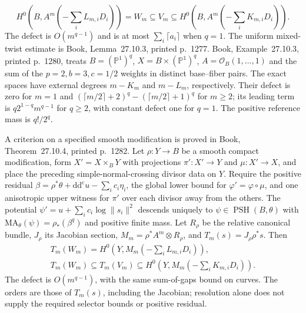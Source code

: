 \documentclass[11pt]{article}
\newcommand{\PSH}{\operatorname{PSH}}
\begin{document}
\[
 H^0\left(B,A^m\left(-\sum_iL_{m,i}D_i\right)\right)=W_m
 \subseteq V_m\subseteq
 H^0\left(B,A^m\left(-\sum_iK_{m,i}D_i\right)\right).
\]
The defect is $O(m^{q-1})$ and is at most $\sum_i\lceil a_i\rceil$ when $q=1$. The uniform mixed-twist estimate is Book, Lemma~27.10.3, printed p.~1277. Book, Example~27.10.3, printed p.~1280, treats $B=(\mathbb P^1)^q$, $X=B\times(\mathbb P^1)^q$, $A=\mathcal O_B(1,\ldots,1)$ and the sum of the $p=2,b=3,c=1/2$ weights in distinct base--fiber pairs. The exact spaces have external degrees $m-K_m$ and $m-L_m$, respectively. Their defect is zero for $m=1$ and $(\lceil m/2\rceil+2)^q-(\lceil m/2\rceil+1)^q$ for $m\geq2$; its leading term is $q2^{1-q}m^{q-1}$ for $q\geq2$, with constant defect one for $q=1$. The positive reference mass is $q!/2^q$.

A criterion on a specified smooth modification is proved in Book, Theorem~27.10.4, printed p.~1282. Let $\rho:Y\to B$ be a smooth compact modification, form $X'=X\times_BY$ with projections $\pi':X'\to Y$ and $\mu:X'\to X$, and place the preceding simple-normal-crossing divisor data on $Y$. Require the positive residual $\beta=\rho^*\theta+\mathrm{dd}^{\mathrm c}u-\sum_i c_i\eta_i$, the global lower bound for $\varphi'=\varphi\circ\mu$, and one anisotropic upper witness for $\pi'$ over each divisor away from the others. The potential $\psi'=u+\sum_i c_i\log\|s_i\|^2$ descends uniquely to $\psi\in\PSH(B,\theta)$ with $\mathrm{MA}_\theta(\psi)=\rho_*(\beta^q)$ and positive finite mass. Let $R_\rho$ be the relative canonical bundle, $J_\rho$ its Jacobian section, $M_m=\rho^*A^m\otimes R_\rho$, and $T_m(s)=J_\rho\rho^*s$. Then
\[
 \begin{gathered}
 T_m(W_m)=H^0\left(Y,M_m\left(-\sum_iL_{m,i}D_i\right)\right),\\
 T_m(W_m)\subseteq T_m(V_m)\subseteq
 H^0\left(Y,M_m\left(-\sum_iK_{m,i}D_i\right)\right).
 \end{gathered}
\]
The defect is $O(m^{q-1})$, with the same sum-of-gaps bound on curves. The orders are those of $T_m(s)$, including the Jacobian; resolution alone does not supply the required selector bounds or positive residual.
\end{document}
